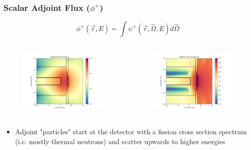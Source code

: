 \documentclass[t]{beamer}
\begin{document}
\begin{frame}
  \frametitle{Scalar Adjoint Flux ($\phi^+$)}
  \vskip-0.25in
  \begin{equation}
    \phi^+\left(\vec{r},E\right) = \int\psi^+\left(\vec{r},\hat{\Omega},E\right)d\hat{\Omega}
  \end{equation}
  \vskip-0.25in
  \begin{columns}
    \begin{figure}
      \includegraphics[trim={0.7in 0.15in 1.05in 0.4in},clip,scale=0.36]{images/scalar_flux_adj_g02.png}
    \end{figure}
    \begin{figure}
      \includegraphics[trim={0.7in 0.15in 1.05in 0.4in},clip,scale=0.36]{images/scalar_flux_adj_g26.png}
    \end{figure}
  \end{columns}
  \begin{itemize}
    \item Adjoint "particles" start at the detector with a fission cross section
          spectrum (i.e. mostly thermal neutrons) and scatter upwards to higher energies
  \end{itemize}
\end{frame}
\end{document}
